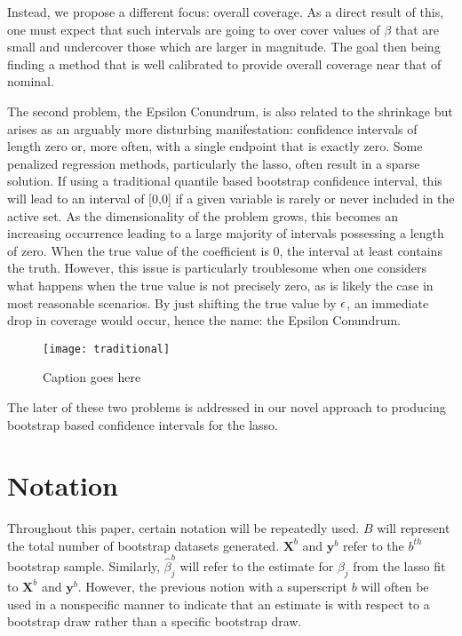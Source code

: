 Instead, we propose a different focus: overall coverage. As a direct result of this, one must expect that such intervals are going to over cover values of $\beta$ that are small and undercover those which are larger in magnitude. The goal then being finding a method that is well calibrated to provide overall coverage near that of nominal.

The second problem, the Epsilon Conundrum, is also related to the shrinkage but arises as an arguably more disturbing manifestation: confidence intervals of length zero or, more often, with a single endpoint that is exactly zero. Some penalized regression methods, particularly the lasso, often result in a sparse solution. If using a traditional quantile based bootstrap confidence interval, this will lead to an interval of [0,0] if a given variable is rarely or never included in the active set. As the dimensionality of the problem grows, this becomes an increasing occurrence leading to a large majority of intervals possessing a length of zero. When the true value of the coefficient is 0, the interval at least contains the truth. However, this issue is particularly troublesome when one considers what happens when the true value is not precisely zero, as is likely the case in most reasonable scenarios. By just shifting the true value by $\epsilon$, an immediate drop in coverage would occur, hence the name: the Epsilon Conundrum.

\begin{figure}[hbtp]
  \texttt{[image: traditional]}
  \caption{\label{Fig:traditional} Caption goes here}
\end{figure}

The later of these two problems is addressed in our novel approach to producing bootstrap based confidence intervals for the lasso.

\section{Notation}

Throughout this paper, certain notation will be repeatedly used. $B$ will represent the total number of bootstrap datasets generated. $\boldsymbol{X}^b$ and $\boldsymbol{y}^b$ refer to the $b^{th}$ bootstrap sample. Similarly, $\hat{\beta}^b_j$ will refer to the estimate for $\beta_j$ from the lasso fit to $\boldsymbol{X}^b$ and $\boldsymbol{y}^b$. However, the previous notion with a superscript $b$ will often be used in a nonspecific manner to indicate that an estimate is with respect to a bootstrap draw rather than a specific bootstrap draw.

